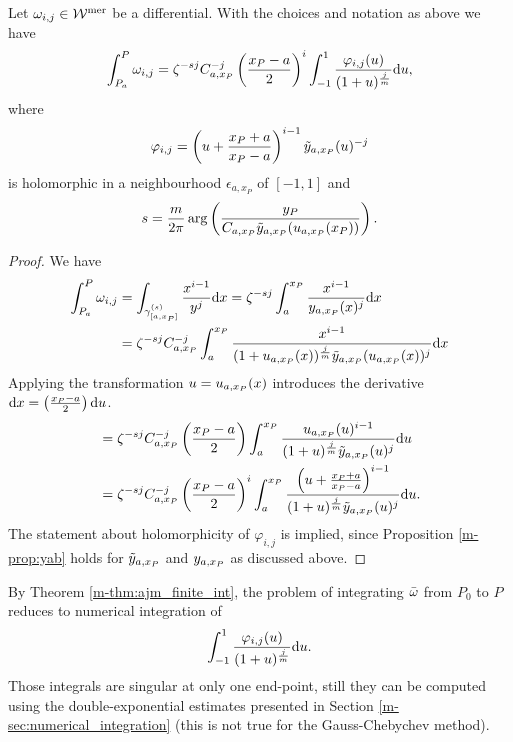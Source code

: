 \documentclass[main.tex]{subfiles}
\begin{document}
  \begin{thm}\label{thm:ajm_finite_int}
  Let $\omega_{i,j} \in \mathcal{W}^{\text{mer}}$ be a differential. With the choices and notation as above we have
 \begin{equation*}\label{eq:aj_int}
       \int_{P_a}^P \omega_{i,j} = \zeta^{-sj} C_{a,x_P}^{-j} \left(\frac{x_P-a}{2}\right)^i \int_{-1}^1 \frac{\varphi_{i,j}(u)}{(1+u)^{\frac{j}{m}}}  \mathrm d u,
  \end{equation*}
   where
   \begin{equation*}
    \varphi_{i,j}  = \left(u+\frac{x_P+a}{x_P-a}\right)^{i-1} \tilde{y}_{a,x_P}(u)^{-j}
   \end{equation*}
   is holomorphic in a neighbourhood $\epsilon_{a,x_P}$ of $[-1,1]$
   and
   \begin{equation*}
   s = \frac{m}{2\pi} \arg\left(  \frac{y_P}{C_{a,x_P} \tilde{y}_{a,x_P}( u_{a,x_P}(x_P) )} \right).
   \end{equation*}
  \end{thm}
  \begin{proof}
    We have
    \begin{align*}
     \int_{P_a}^P \omega_{i,j}  & =  \int_{\gamma^{(s)}_{[a,x_P]}} \frac{x^{i-1}}{y^j}  \mathrm d x  =  \zeta^{-sj} \int_a^{x_P} \frac{x^{i-1}}{y_{a,x_P}(x)^j}  \mathrm d x \\  & =
     \zeta^{-sj} C_{a,x_P}^{-j}  \int_a^{x_P} \frac{x^{i-1}}{(1+u_{a,x_P}(x))^{\frac{j}{m}}\tilde{y}_{a,x_P}(u_{a,x_P}(x))^j}  \mathrm d x
  \end{align*}
   Applying the transformation $u = u_{a,x_P}(x)$ introduces the derivative $\mathrm d x = \left(\frac{x_P-a}{2}\right) \mathrm d u$.
  \begin{align*}
   & =  \zeta^{-sj} C_{a,x_P}^{-j} \left(\frac{x_P-a}{2}\right) \int_a^{x_P} \frac{u_{a,x_P}(u)^{i-1}}{(1+u)^{\frac{j}{m}}\tilde{y}_{a,x_P}(u)^j}  \mathrm d u \\ & =
   \zeta^{-sj} C_{a,x_P}^{-j} \left(\frac{x_P-a}{2}\right)^i \int_a^{x_P} \frac{\left(u + \frac{x_P+a}{x_P-a}\right)^{i-1}}{(1+u)^{\frac{j}{m}}\tilde{y}_{a,x_P}(u)^j}  \mathrm d u.
  \end{align*}
  The statement about holomorphicity of $\varphi_{i,j}$ is implied, since
  Proposition \ref{m-prop:yab} holds for $\tilde{y}_{a,x_P}$ and $y_{a,x_P}$ as discussed
  above.
  \end{proof}

  \begin{rmk}\label{rmk:ajm_finite_int}
   By Theorem \ref{m-thm:ajm_finite_int}, the problem of integrating $\bar{\omega}$ from $P_0$ to $P$ reduces to numerical integration of
    \begin{equation*}
       \int_{-1}^1 \frac{\varphi_{i,j}(u)}{(1+u)^{\frac{j}{m}}}  \mathrm d u.
   \end{equation*}
   Those integrals are singular at only one end-point, still they
   can be computed using the double-exponential estimates presented in Section
   \ref{m-sec:numerical_integration} (this is not true for the Gauss-Chebychev method).
   \end{rmk}
\end{document}
